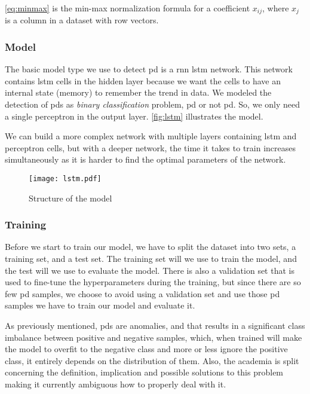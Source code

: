 

\autoref{eq:minmax} is the min-max normalization formula for a coefficient $x_{ij}$, where $x_j$ is a column in a dataset with row vectors.

\subsubsection{Model}
The basic model type we use to detect \ac{pd} is a \ac{rnn} \ac{lstm} network. This network contains \ac{lstm} cells in the hidden layer because we want the cells to have an internal state (memory) to remember the trend in data. We modeled the detection of \acp{pd} as \emph{binary classification} problem, \ac{pd} or not \ac{pd}. So, we only need a single perceptron in the output layer. \autoref{fig:lstm} illustrates the model.

We can build a more complex network with multiple layers containing \ac{lstm} and perceptron cells, but with a deeper network, the time it takes to train increases simultaneously as it is harder to find the optimal parameters of the network. 

\begin{figure}[ht]
    \centering
    \texttt{[image: lstm.pdf]}
    \caption{Structure of the model}
    \label{fig:lstm}
\end{figure}

\subsubsection{Training}
Before we start to train our model, we have to split the dataset into two sets, a training set, and a test set. The training set will we use to train the model, and the test will we use to evaluate the model. There is also a validation set that is used to fine-tune the hyperparameters during the training, but since there are so few \ac{pd} samples, we choose to avoid using a validation set and use those \ac{pd} samples we have to train our model and evaluate it.

As previously mentioned, \acp{pd} are anomalies, and that results in a significant class imbalance between positive and negative samples, which, when trained will make the model to overfit to the negative class and more or less ignore the positive class, it entirely depends on the distribution of them. Also, the academia is split concerning the definition, implication and possible solutions to this problem~\cite{tw_imbalance_2} making it currently ambiguous how to properly deal with it.

